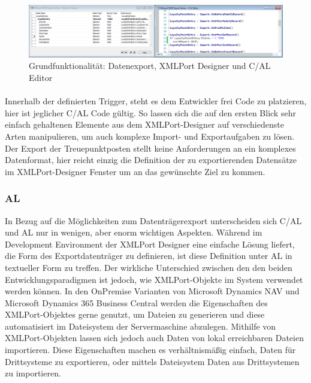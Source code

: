 \begin{figure}[h]
	\centering
	\includegraphics[width=145mm]{images/xmlport}
	\caption{Grundfunktionalität: Datenexport, XMLPort Designer und C/AL Editor}
	\label{fig:Request Page}
\end{figure}

\paragraph{}
Innerhalb der definierten Trigger, steht es dem Entwickler frei Code zu platzieren, hier ist jeglicher C/AL Code gültig. So lassen sich die auf den ersten Blick sehr einfach gehaltenen Elemente aus dem XMLPort-Designer auf verschiedenste Arten manipulieren, um auch komplexe Import- und Exportaufgaben zu lösen. Der Export der Treuepunktposten stellt keine Anforderungen an ein komplexes Datenformat, hier reicht einzig die Definition der zu exportierenden Datensätze im XMLPort-Designer Fenster um an das gewünschte Ziel zu kommen.
\pagebreak


\subsubsection{AL}
In Bezug auf die Möglichkeiten zum Datenträgerexport unterscheiden sich C/AL und AL nur in wenigen, aber enorm wichtigen Aspekten. Während im Development Environment der XMLPort Designer eine einfache Lösung liefert, die Form des Exportdatenträger zu definieren, ist diese Definition unter AL in textueller Form zu treffen. Der wirkliche Unterschied zwischen den den beiden Entwicklungsparadigmen ist jedoch, wie XMLPort-Objekte im System verwendet werden können. In den OnPremise Varianten von Microsoft Dynamics NAV und Microsoft Dynamics 365 Business Central werden die Eigenschaften des XMLPort-Objektes gerne genutzt, um Dateien zu generieren und diese automatisiert im Dateisystem der Servermaschine abzulegen. Mithilfe von XMLPort-Objekten lassen sich jedoch auch Daten von lokal erreichbaren Dateien importieren. Diese Eigenschaften machen es verhältnismäßig einfach, Daten für Drittsysteme zu exportieren, oder mittels Dateisystem Daten aus Drittsystemen zu importieren. 

